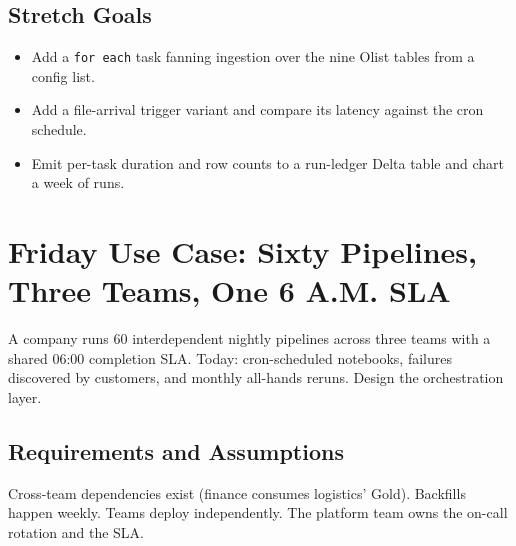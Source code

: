 \subsection*{Stretch Goals}
\begin{itemize}
    \item Add a \texttt{for each} task fanning ingestion over the nine Olist tables from a config list.
    \item Add a file-arrival trigger variant and compare its latency against the cron schedule.
    \item Emit per-task duration and row counts to a run-ledger Delta table and chart a week of runs.
\end{itemize}

\section{Friday Use Case: Sixty Pipelines, Three Teams, One 6 A.M. SLA}
A company runs 60 interdependent nightly pipelines across three teams with a shared 06:00 completion SLA. Today: cron-scheduled notebooks, failures discovered by customers, and monthly all-hands reruns. Design the orchestration layer.

\subsection{Requirements and Assumptions}
Cross-team dependencies exist (finance consumes logistics' Gold). Backfills happen weekly. Teams deploy independently. The platform team owns the on-call rotation and the SLA.

